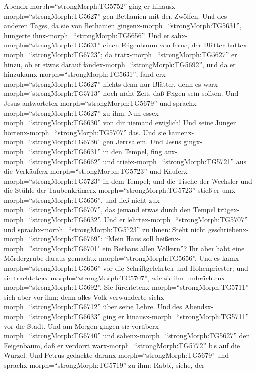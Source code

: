 Abendx-morph=``strongMorph:TG5752'' ging er
hinausx-morph=``strongMorph:TG5627'' gen Bethanien mit den Zwölfen.
 Und des anderen Tages, da sie von Bethanien
gingenx-morph=``strongMorph:TG5631'', hungerte
ihnx-morph=``strongMorph:TG5656''.  Und er
sahx-morph=``strongMorph:TG5631'' einen Feigenbaum von ferne, der
Blätter hattex-morph=``strongMorph:TG5723''; da
tratx-morph=``strongMorph:TG5627'' er hinzu, ob er etwas darauf
fändex-morph=``strongMorph:TG5692'', und da er
hinzukamx-morph=``strongMorph:TG5631'', fand
erx-morph=``strongMorph:TG5627'' nichts denn nur Blätter, denn es
warx-morph=``strongMorph:TG5713'' noch nicht Zeit, daß Feigen sein
sollten.  Und Jesus
antwortetex-morph=``strongMorph:TG5679'' und
sprachx-morph=``strongMorph:TG5627'' zu ihm: Nun
essex-morph=``strongMorph:TG5630'' von dir niemand ewiglich! Und seine
Jünger hörtenx-morph=``strongMorph:TG5707'' das.  Und sie
kamenx-morph=``strongMorph:TG5736'' gen Jerusalem. Und Jesus
gingx-morph=``strongMorph:TG5631'' in den Tempel, fing
anx-morph=``strongMorph:TG5662'' und triebx-morph=``strongMorph:TG5721''
aus die Verkäuferx-morph=``strongMorph:TG5723'' und
Käuferx-morph=``strongMorph:TG5723'' in dem Tempel; und die Tische der
Wechsler und die Stühle der Taubenkrämerx-morph=``strongMorph:TG5723''
stieß er umx-morph=``strongMorph:TG5656'',  und ließ nicht
zux-morph=``strongMorph:TG5707'', das jemand etwas durch den Tempel
trügex-morph=``strongMorph:TG5632''.  Und er
lehrtex-morph=``strongMorph:TG5707'' und
sprachx-morph=``strongMorph:TG5723'' zu ihnen: Steht nicht
geschriebenx-morph=``strongMorph:TG5769'': ``Mein Haus soll
heißenx-morph=''strongMorph:TG5701" ein Bethaus allen Völkern''? Ihr
aber habt eine Mördergrube daraus gemachtx-morph=``strongMorph:TG5656''.
 Und es kamx-morph=``strongMorph:TG5656'' vor die
Schriftgelehrten und Hohenpriester; und sie
trachtetenx-morph=``strongMorph:TG5707'', wie sie ihn
umbrächtenx-morph=``strongMorph:TG5692''. Sie
fürchtetenx-morph=``strongMorph:TG5711'' sich aber vor ihm; denn alles
Volk verwunderte sichx-morph=``strongMorph:TG5712'' über seine Lehre.
 Und des Abendsx-morph=``strongMorph:TG5633'' ging er
hinausx-morph=``strongMorph:TG5711'' vor die Stadt.  Und am
Morgen gingen sie vorüberx-morph=``strongMorph:TG5740'' und
sahenx-morph=``strongMorph:TG5627'' den Feigenbaum, daß er verdorrt
warx-morph=``strongMorph:TG5772'' bis auf die Wurzel.  Und
Petrus gedachte daranx-morph=``strongMorph:TG5679'' und
sprachx-morph=``strongMorph:TG5719'' zu ihm: Rabbi, siehe, der
